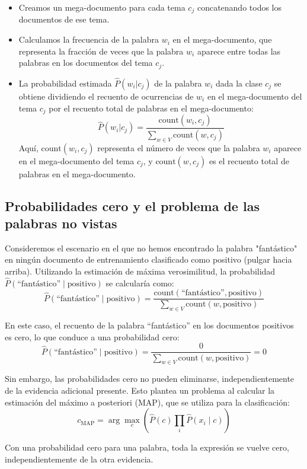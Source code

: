 \begin{itemize}
  \item Creamos un mega-documento para cada tema $c_j$ concatenando todos los documentos de ese tema.
  \item Calculamos la frecuencia de la palabra $w_i$ en el mega-documento, que representa la fracción de veces que la palabra $w_i$ aparece entre todas las palabras en los documentos del tema $c_j$.
  \item La probabilidad estimada $\hat{P}(w_i | c_j)$ de la palabra $w_i$ dada la clase $c_j$ se obtiene dividiendo el recuento de ocurrencias de $w_i$ en el mega-documento del tema $c_j$ por el recuento total de palabras en el mega-documento:
  \[
  \hat{P}(w_i | c_j) = \frac{{\text{count}(w_i, c_j)}}{\sum_{w\in V}{\text{count}(w, c_j)}}
  \]
  Aquí, $\text{count}(w_i, c_j)$ representa el número de veces que la palabra $w_i$ aparece en el mega-documento del tema $c_j$, y $\text{count}(w, c_j)$ es el recuento total de palabras en el mega-documento.
\end{itemize}

\subsection{Probabilidades cero y el problema de las palabras no vistas}

Consideremos el escenario en el que no hemos encontrado la palabra "fantástico" en ningún documento de entrenamiento clasificado como positivo (pulgar hacia arriba). Utilizando la estimación de máxima verosimilitud, la probabilidad $\hat{P}(\text{``fantástico''} \mid \text{positivo})$ se calcularía como:
\[
\hat{P}(\text{``fantástico''} \mid \text{positivo}) = \frac{\text{count}(\text{``fantástico''}, \text{positivo})}{\sum_{w \in V} \text{count}(w, \text{positivo})}
\]

En este caso, el recuento de la palabra ``fantástico'' en los documentos positivos es cero, lo que conduce a una probabilidad cero:
\[
\hat{P}(\text{``fantástico''} \mid \text{positivo}) = \frac{0}{\sum_{w \in V} \text{count}(w, \text{positivo})} = 0
\]

Sin embargo, las probabilidades cero no pueden eliminarse, independientemente de la evidencia adicional presente. Esto plantea un problema al calcular la estimación del máximo a posteriori (MAP), que se utiliza para la clasificación:
\[
c_{\text{MAP}} = \arg\max_c \left(\hat{P}(c) \prod_{i} \hat{P}(x_i \mid c)\right)
\]

Con una probabilidad cero para una palabra, toda la expresión se vuelve cero, independientemente de la otra evidencia.

